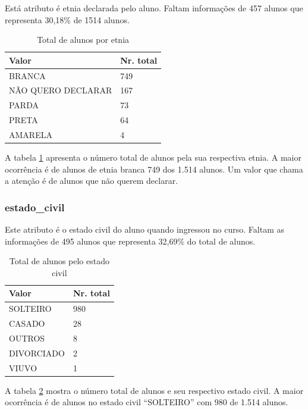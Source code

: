 \documentclass[diss,capa]{texufpel}
\begin{document}
Está atributo é etnia declarada pelo aluno.
Faltam informações de 457 alunos que representa 30,18\% de 1514 alunos.

\begin{table}[htbp]
\begin{center}
\caption{Total de alunos por etnia}
\label{tab:total-etnia}
\begin{tabular}{p{8.5cm}|p{6cm}} \hline
Valor & Nr. total \\ \hline
BRANCA & 749 \\
NÃO QUERO DECLARAR & 167 \\
PARDA &  73 \\
PRETA &  64 \\
AMARELA & 4 \\ \hline
\end{tabular}
\end{center}
\end{table}

A tabela \ref{tab:total-etnia} apresenta o número total de alunos pela sua respectiva etnia.
A maior ocorrência é de alunos de etnia branca 749 dos 1.514 alunos.
Um valor que chama a atenção é de alunos que não querem declarar.

\subsubsection{estado\_civil}

Este atributo é o estado civil do aluno quando ingressou no curso.
Faltam as informações de 495 alunos que representa 32,69\% do total de alunos.

\begin{table}[htbp]
\begin{center}
\caption{Total de alunos pelo estado civil}
\label{tab:total-alunos-estado-civil}
\begin{tabular}{p{8.5cm}|p{6cm}} \hline
Valor      & Nr. total \\ \hline
SOLTEIRO   & 980 \\
CASADO     &  28 \\
OUTROS     &   8 \\
DIVORCIADO &   2 \\
VIUVO      &   1 \\ \hline
\end{tabular}
\end{center}
\end{table}

A tabela \ref{tab:total-alunos-estado-civil} mostra o número total de alunos e seu respectivo estado civil.
A maior ocorrência é de alunos no estado civil ``SOLTEIRO'' com 980 de 1.514 alunos.
\end{document}
